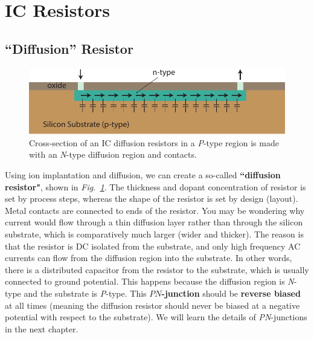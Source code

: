 \section{IC Resistors}
\subsection{“Diffusion” Resistor}
\begin{figure}[tb]
\centering
\includegraphics[width=.7\columnwidth]{diff_resistor}
\caption{Cross-section of an IC diffusion resistors in a \emph{P}-type region is made with an \emph{N}-type diffusion region and contacts.}
\label{fig:mod2-2_ICtech_sld_5}
\end{figure}
Using ion implantation and diffusion, we can create a so-called \textbf{``diffusion resistor"}, shown in \emph{Fig.~\ref{fig:mod2-2_ICtech_sld_5}}.  The thickness and dopant concentration of resistor is set by process steps, whereas the shape of the resistor is set by design (layout).   Metal contacts are connected to ends of the resistor.  You may be wondering why current would flow through a thin diffusion layer rather than through the silicon substrate, which is comparatively much larger (wider and thicker).  The reason is that the resistor is DC isolated from the substrate, and only high frequency AC currents can flow from the diffusion region into the substrate.  In other words, there is a distributed capacitor from the resistor to the substrate, which is usually connected to ground potential.  This happens because the diffusion region is \emph{N}-type and the substrate is \emph{P}-type.  This \textbf{$PN$-junction} should be \textbf{reverse biased} at all times (meaning the diffusion resistor should never be biased at a negative potential with respect to the substrate).  We will learn the details of \emph{PN}-junctions in the next chapter.
